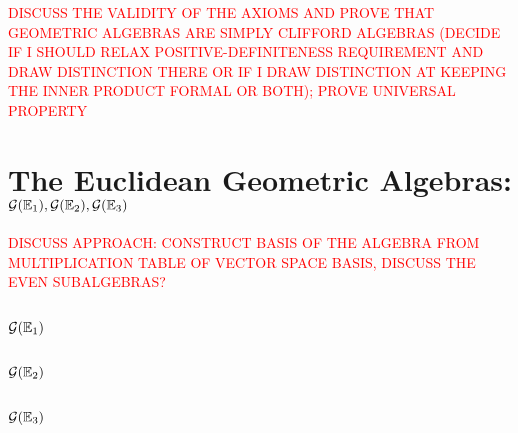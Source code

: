 \textcolor{red}{DISCUSS THE VALIDITY OF THE AXIOMS AND PROVE THAT GEOMETRIC ALGEBRAS ARE SIMPLY CLIFFORD ALGEBRAS (DECIDE IF I SHOULD RELAX POSITIVE-DEFINITENESS REQUIREMENT AND DRAW DISTINCTION THERE OR IF I DRAW DISTINCTION AT KEEPING THE INNER PRODUCT FORMAL OR BOTH); PROVE UNIVERSAL PROPERTY}

\newpage

\section{The Euclidean Geometric Algebras: $\mathcal{G}(\mathbb{E}_1), \mathcal{G}(\mathbb{E}_2), \mathcal{G}(\mathbb{E}_3)$ }

\textcolor{red}{DISCUSS APPROACH: CONSTRUCT BASIS OF THE ALGEBRA FROM MULTIPLICATION TABLE OF VECTOR SPACE BASIS, DISCUSS THE EVEN SUBALGEBRAS?}

\subsection{$\mathcal{G}(\mathbb{E}_1)$}

\subsection{$\mathcal{G}(\mathbb{E}_2)$}

\subsection{$\mathcal{G}(\mathbb{E}_3)$}

